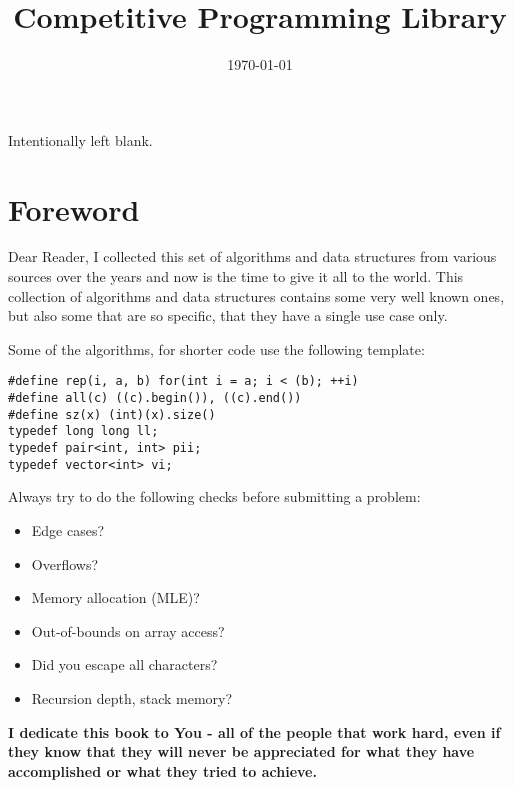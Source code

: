 \documentclass{article}
\title{\textbf{Competitive Programming Library}}
\date{\today}
\author{}
\begin{document}
\maketitle

\newpage

\vspace*{\fill}
\begin{center}
  Intentionally left blank.
\end{center}
\vspace*{\fill}

\newpage

\tableofcontents

\newpage

\section{Foreword}

Dear Reader, I collected this set of algorithms and data structures from various sources
over the years and now is the time to give it all to the world. This collection of algorithms
and data structures contains some very well known ones, but also some that are so specific, that
they have a single use case only.

Some of the algorithms, for shorter code use the following template:

\begin{lstlisting}
#define rep(i, a, b) for(int i = a; i < (b); ++i)
#define all(c) ((c).begin()), ((c).end())
#define sz(x) (int)(x).size()
typedef long long ll;
typedef pair<int, int> pii;
typedef vector<int> vi;
\end{lstlisting}

Always try to do the following checks before submitting a problem:
\begin{itemize}
  \item Edge cases?
  \item Overflows?
  \item Memory allocation (MLE)?
  \item Out-of-bounds on array access?
  \item Did you escape all characters?
  \item Recursion depth, stack memory?
\end{itemize}

\noindent \hrulefill

\textbf{I dedicate this book to You - all of the people that work hard, even if they know
that they will never be appreciated for what they have accomplished or what they tried to achieve.}
\end{document}
